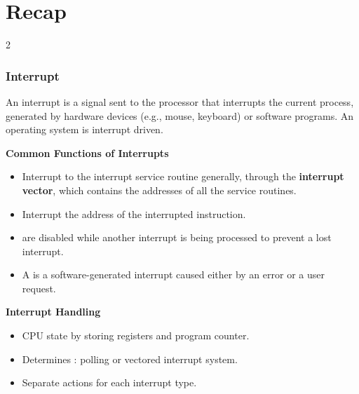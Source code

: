 \chapter{Recap}
\pagebreak





\begin{multicols}{2}
\subsection*{Interrupt}

An interrupt is a signal sent to the processor that interrupts the current process, generated by hardware devices (e.g., mouse, keyboard) or software programs. An operating system is interrupt driven.

\textbf{Common Functions of Interrupts}
\begin{itemize}[topsep=-0.5em, parsep=0.5em]
   \item Interrupt  to the interrupt service routine generally, through the \textbf{interrupt vector}, which contains the addresses of all the service routines.
   
   \item Interrupt  the address of the interrupted instruction.
   
   \item {} are disabled while another interrupt is being processed to prevent a lost interrupt.
   
   \item A  is a software-generated interrupt caused either by an error or a user request.
\end{itemize}

\textbf{Interrupt Handling}
\begin{itemize}[topsep=-0.5em, parsep=0.5em]
   \item	{} CPU state by storing registers and program counter.
   \item	Determines : polling or vectored interrupt system.
   \item	Separate  actions for each interrupt type.
\end{itemize}


\end{multicols}
